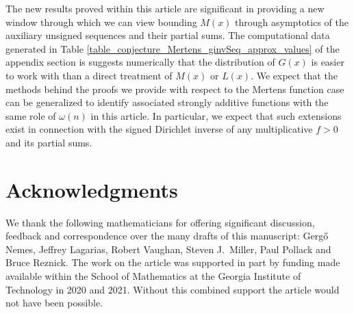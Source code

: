 \documentclass[11pt,reqno,a4letter]{article}
\newcommand{\hlocalref}[1]{\hyperref[#1]{\ref{#1}}}
\numberwithin{equation}{section}
\numberwithin{figure}{section}
\numberwithin{table}{section}
\theoremstyle{plain}
\numberwithin{theorem}{section}
\theoremstyle{definition}
\begin{document}
The new results proved within this article 
are significant in providing a new window through which we can view bounding $M(x)$ 
through asymptotics of the auxiliary unsigned sequences and their partial sums. 
The computational data generated in 
Table \hlocalref{table_conjecture_Mertens_ginvSeq_approx_values} of the appendix section 
is suggests numerically that the distribution of $G(x)$ is easier to work with 
than a direct treatment of $M(x)$ or $L(x)$. 
We expect that the methods behind the proofs we 
provide with respect to the Mertens function case can be generalized to identify 
associated strongly additive functions with the same role of $\omega(n)$ in this article. 
In particular, we expect that such extensions exist in connection with the signed Dirichlet inverse 
of any multiplicative $f > 0$ and its partial sums. 

\section*{Acknowledgments}

We thank the following mathematicians for offering significant 
discussion, feedback and correspondence over the many drafts of this manuscript: 
Gerg\H{o} Nemes, Jeffrey Lagarias, Robert Vaughan, Steven J.~Miller, 
Paul Pollack and Bruce Reznick. 
The work on the article was supported in part by 
funding made available within the School of Mathematics at the 
Georgia Institute of Technology in 2020 and 2021. 
Without this combined support the article would not have been possible.

\renewcommand{\refname}{References} 

\end{document}
